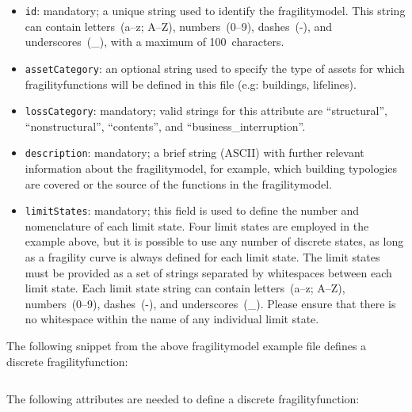 \begin{itemize}

    \item \Verb+id+: mandatory; a unique string used to identify the 
      \gls{fragilitymodel}. This string can contain letters~(a--z; A--Z), 
      numbers~(0--9), dashes~(-), and underscores~(\_), with a maximum of 
      100~characters.

    \item \Verb+assetCategory+: an optional string used to specify the type of
      \glspl{asset} for which \glspl{fragilityfunction} will be defined in this
      file (e.g: buildings, lifelines).

    \item \Verb+lossCategory+: mandatory; valid strings for this attribute are 
      ``structural'', ``nonstructural'', ``contents'', and 
      ``business\_interruption''.

    \item \Verb+description+: mandatory; a brief string (ASCII) with further 
      relevant information about the \gls{fragilitymodel}, 
      for example, which building typologies are covered
      or the source of the functions in the \gls{fragilitymodel}.

    \item \Verb+limitStates+: mandatory; this field is used to define the number and 
      nomenclature of each limit state. Four limit states are employed in the 
      example above, but it is possible to use any number of discrete states,
      as long as a fragility curve is always defined for each limit state. The 
      limit states must be provided as a set of strings separated by whitespaces 
      between each limit state. Each limit state string can contain
      letters~(a--z; A--Z), numbers~(0--9), dashes~(-), and underscores~(\_).
      Please ensure that there is no whitespace within the name of any
      individual limit state.

\end{itemize}



The following snippet from the above \gls{fragilitymodel} example file defines a
discrete \gls{fragilityfunction}:

\inputminted[firstline=11,firstnumber=11,lastline=17,fontsize=\footnotesize,frame=single,linenos,bgcolor=lightgray]{xml}{oqum/risk/verbatim/input_fragility.xml}

The following attributes are needed to define a discrete \gls{fragilityfunction}:

